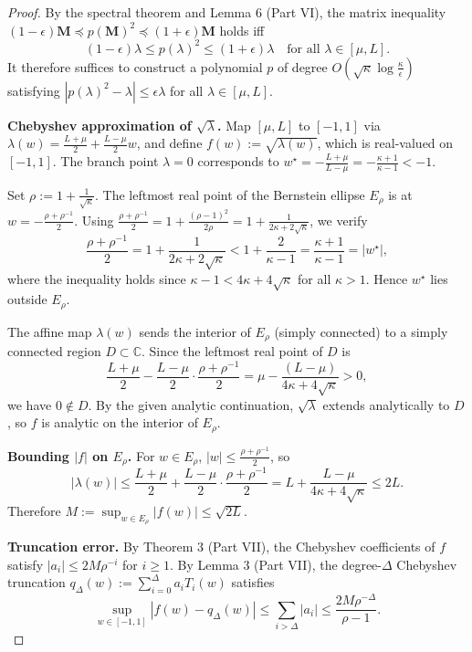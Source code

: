 \documentclass[12pt]{article}
\begin{document}
\begin{proof}
By the spectral theorem and Lemma 6 (Part VI), the matrix inequality $(1-\epsilon)\mathbf{M} \preceq p(\mathbf{M})^2 \preceq (1+\epsilon)\mathbf{M}$ holds iff
\[
    (1-\epsilon)\lambda \leq p(\lambda)^2 \leq (1+\epsilon)\lambda \quad \text{for all } \lambda \in [\mu, L].
\]
It therefore suffices to construct a polynomial $p$ of degree $O(\sqrt{\kappa}\log\frac{\kappa}{\epsilon})$ satisfying $|p(\lambda)^2 - \lambda| \leq \epsilon\lambda$ for all $\lambda \in [\mu, L]$.

\textbf{Chebyshev approximation of $\sqrt{\lambda}$.}
Map $[\mu, L]$ to $[-1,1]$ via $\lambda(w) = \frac{L+\mu}{2} + \frac{L-\mu}{2}w$, and define $f(w) := \sqrt{\lambda(w)}$, which is real-valued on $[-1,1]$. The branch point $\lambda = 0$ corresponds to $w^\star = -\frac{L+\mu}{L-\mu} = -\frac{\kappa+1}{\kappa-1} < -1$.

Set $\rho := 1 + \frac{1}{\sqrt{\kappa}}$. The leftmost real point of the Bernstein ellipse $E_\rho$ is at $w = -\frac{\rho + \rho^{-1}}{2}$. Using $\frac{\rho+\rho^{-1}}{2} = 1 + \frac{(\rho-1)^2}{2\rho} = 1 + \frac{1}{2\kappa + 2\sqrt{\kappa}}$, we verify
\[
    \frac{\rho + \rho^{-1}}{2} = 1 + \frac{1}{2\kappa + 2\sqrt{\kappa}} < 1 + \frac{2}{\kappa - 1} = \frac{\kappa+1}{\kappa-1} = |w^\star|,
\]
where the inequality holds since $\kappa - 1 < 4\kappa + 4\sqrt{\kappa}$ for all $\kappa > 1$. Hence $w^\star$ lies outside $E_\rho$.

The affine map $\lambda(w)$ sends the interior of $E_\rho$ (simply connected) to a simply connected region $D \subset \mathbb{C}$. Since the leftmost real point of $D$ is
\[
    \frac{L+\mu}{2} - \frac{L-\mu}{2} \cdot \frac{\rho+\rho^{-1}}{2} = \mu - \frac{(L-\mu)}{4\kappa + 4\sqrt{\kappa}} > 0,
\]
we have $0 \notin D$. By the given analytic continuation, $\sqrt{\lambda}$ extends analytically to $D$, so $f$ is analytic on the interior of $E_\rho$.

\textbf{Bounding $|f|$ on $E_\rho$.}
For $w \in E_\rho$, $|w| \leq \frac{\rho+\rho^{-1}}{2}$, so
\[
    |\lambda(w)| \leq \frac{L+\mu}{2} + \frac{L-\mu}{2} \cdot \frac{\rho + \rho^{-1}}{2} = L + \frac{L-\mu}{4\kappa + 4\sqrt{\kappa}} \leq 2L.
\]
Therefore $M := \sup_{w \in E_\rho} |f(w)| \leq \sqrt{2L}$.

\textbf{Truncation error.}
By Theorem 3 (Part VII), the Chebyshev coefficients of $f$ satisfy $|a_i| \leq 2M\rho^{-i}$ for $i \geq 1$. By Lemma 3 (Part VII), the degree-$\Delta$ Chebyshev truncation $q_\Delta(w) := \sum_{i=0}^{\Delta} a_i T_i(w)$ satisfies
\[
    \sup_{w \in [-1,1]} |f(w) - q_\Delta(w)| \leq \sum_{i > \Delta} |a_i| \leq \frac{2M\rho^{-\Delta}}{\rho - 1}.
\]


\end{proof}
\end{document}
